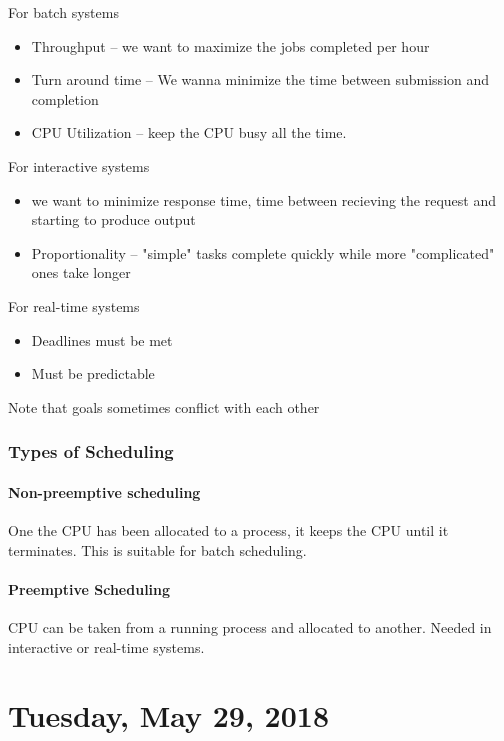 \documentclass{article}
\begin{document}
For batch systems
\begin{itemize}
  \item Throughput -- we want to maximize the jobs completed per hour
  \item Turn around time -- We wanna minimize the time between submission and completion
  \item CPU Utilization -- keep the CPU busy all the time.
\end{itemize}

For interactive systems
\begin{itemize}
  \item we want to minimize response time, time between recieving the request and starting to produce output
  \item Proportionality -- "simple" tasks complete quickly while more "complicated" ones take longer
\end{itemize}

For real-time systems
\begin{itemize}
  \item Deadlines must be met
  \item Must be predictable
\end{itemize}

Note that goals sometimes conflict with each other

\subsubsection{Types of Scheduling}

\paragraph{Non-preemptive scheduling} One the CPU has been allocated to a process, it keeps the CPU until it terminates. This is suitable for batch scheduling.

\paragraph{Preemptive Scheduling} CPU can be taken from a running process and allocated to another. Needed in interactive or real-time systems.

\newpage

\section{Tuesday, May 29, 2018}
\end{document}
